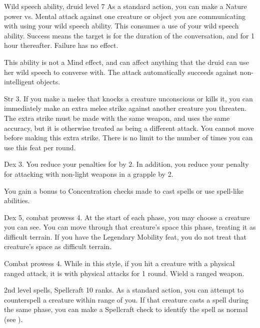 \featpres Wild speech ability, druid level 7
\featben  As a standard action, you can make a Nature power vs. Mental attack against one creature or object you are communicating with using your wild speech ability.
This consumes a use of your wild speech ability.
Success means the target is \charmed for the duration of the conversation, and for 1 hour thereafter.
Failure has no effect.

This ability is not a Mind effect, and can affect anything that the druid can use her wild speech to converse with.
The attack automatically succeeds against non-intelligent objects.

\featpre Str 3.
\featben If you make a melee  that knocks a creature unconscious or kills it, you can immediately make an extra melee strike against another creature you threaten.
The extra strike must be made with the same weapon, and uses the same accuracy, but it is otherwise treated as being a different attack.
You cannot move before making this extra strike.
There is no limit to the number of times you can use this feat per round.

\featpre Dex 3.
\featben You reduce your penalties for  by 2. In addition, you reduce your penalty for attacking with non-light weapons in a grapple by 2.

\featben You gain a  bonus to Concentration checks made to cast spells or use spell-like abilities.

\featpres Dex 5, combat prowess 4.
\featben At the start of each phase, you may choose a creature you can see.
You can move through that creature's space this phase, treating it as difficult terrain.
 If you have the Legendary Mobility feat, you do not treat that creature's space as difficult terrain.

\featpres Combat prowess 4.
\featben While in this style, if you hit a creature with a physical ranged attack, it is \impaired with physical attacks for 1 round.
\stylereq Wield a ranged weapon.

\featpres 2nd level spells, Spellcraft 10 ranks.
\featben As a standard action, you can attempt to counterspell a creature within \rngmed range of you.
If that creature casts a spell during the same phase, you can make a Spellcraft check to identify the spell as normal (see ).

